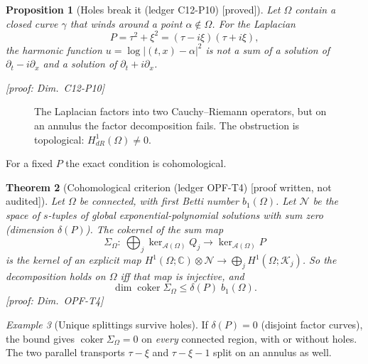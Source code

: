 \documentclass[11pt]{article}
\theoremstyle{plain}
\newtheorem{theorem}{Theorem}[section]
\newtheorem{proposition}[theorem]{Proposition}
\theoremstyle{definition}
\theoremstyle{remark}
\newtheorem{example}[theorem]{Example}
\newcommand{\C}{\mathbb{C}}
\DeclareMathOperator{\dimc}{dim}
\newcommand{\badge}[2]{\textcolor{#1}{\textsf{\footnotesize[#2]}}}
\newcommand{\proved}[1][]{\badge{cC}{proved#1}}
\newcommand{\led}[1]{\textcolor{cG}{\textsf{\footnotesize(ledger #1)}}}
\newcommand{\dimref}[1]{\textsf{\footnotesize[proof: Dim.~#1]}}
\newcommand{\pw}{\badge{cD}{proof written, not audited}}
\begin{document}
\begin{proposition}[{Holes break it \led{C12-P10} \proved}]\label{f:prop:holes}
Let $\Omega$ contain a closed curve $\gamma$ that winds around a point $\alpha\notin\Omega$. For the Laplacian
\[
P=\tau^2+\xi^2=(\tau-i\xi)(\tau+i\xi),
\]
the harmonic function $u=\log|(t,x)-\alpha|^2$ is \emph{not} a sum of a solution of $\partial_t-i\partial_x$ and a solution of $\partial_t+i\partial_x$.

\dimref{C12-P10}
\end{proposition}

\begin{figure}[!htb]
\centering
{}
\caption{The Laplacian factors into two Cauchy--Riemann operators, but on an annulus the factor decomposition fails. The obstruction is topological: $H^1_{dR}(\Omega)\neq0$.}\label{f:fig:hole}
\end{figure}

For a fixed $P$ the exact condition is cohomological.

\begin{theorem}[{Cohomological criterion \led{OPF-T4} \pw}]\label{thm:cohom}
Let $\Omega$ be connected, with first Betti number $b_1(\Omega)$. Let $\mathcal N$ be the space of $s$-tuples of global exponential-polynomial solutions with sum zero (dimension $\delta(P)$). The cokernel of the sum map
\[
\Sigma_\Omega:\ \bigoplus_j\ker_{\mathcal A(\Omega)}Q_j\to\ker_{\mathcal A(\Omega)}P
\]
is the kernel of an explicit map $H^1(\Omega;\C)\otimes\mathcal N\to\bigoplus_jH^1(\Omega;\mathcal K_j)$. So the decomposition holds on $\Omega$ iff that map is injective, and
\[
\dimc\operatorname{coker}\Sigma_\Omega\le\delta(P)\;b_1(\Omega).
\]
\dimref{OPF-T4}
\end{theorem}

\begin{example}[{Unique splittings survive holes}]
If $\delta(P)=0$ (disjoint factor curves), the bound gives $\operatorname{coker}\Sigma_\Omega=0$ on \emph{every} connected region, with or without holes. The two parallel transports $\tau-\xi$ and $\tau-\xi-1$ split on an annulus as well.
\end{example}
\end{document}
